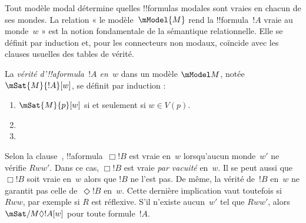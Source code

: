 \documentclass[../../../include/open-logic-section]{subfiles}
\begin{document}


Tout modèle modal détermine quelles !!{formula}s modales sont vraies
en chacun de ses mondes. La relation « le modèle~$\mModel{M}$ rend
la !!{formula}~$!A$ vraie au monde~$w$ » est la notion fondamentale
de la sémantique relationnelle. Elle se définit par induction et,
pour les connecteurs non modaux, coïncide avec les clauses usuelles
des tables de vérité.

\begin{defn}
  La \emph{vérité d'!!a{formula}~$!A$ en~$w$} dans un modèle
  $\mModel M$, notée $\mSat{M}{!A}[w]$, se définit par induction :
  \begin{enumerate}
  \item $\mSat{M}{p}[w]$ si et seulement si $w \in V(p)$.
  \item{}
  \item{}
  \end{enumerate}
\end{defn}

Selon la clause~, !!a{formula}~$\Box
!B$ est vraie en~$w$ lorsqu'aucun monde~$w'$ ne vérifie $Rww'$.
Dans ce cas, $\Box !B$ est vraie \emph{par vacuité} en~$w$.
Il se peut aussi que $\Box !B$ soit vraie en~$w$ alors que
$!B$ ne l'est pas. De même, la vérité de~$!B$ en~$w$
ne garantit pas celle de~$\Diamond !B$ en~$w$.
Cette dernière implication vaut toutefois si $Rww$, par exemple
si $R$ est réflexive. S'il n'existe aucun~$w'$ tel que $Rww'$,
alors $\mSat/{M}{\Diamond !A}[w]$ pour toute formule~$!A$.
\end{document}
